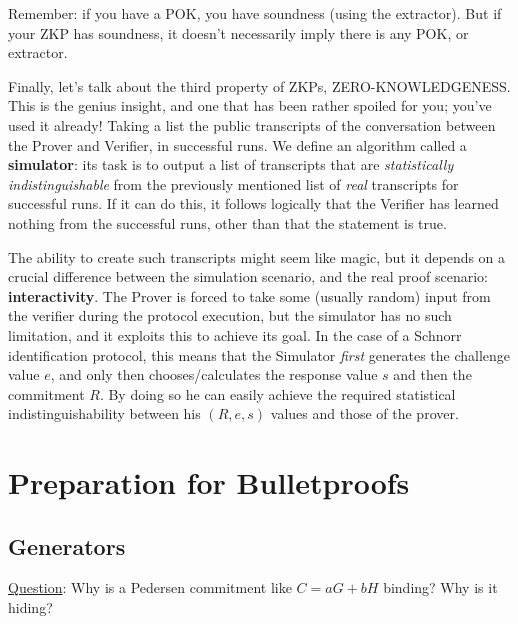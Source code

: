 \documentclass[10pt,a4paper]{article}
\begin{document}
\vspace{5 pt}

Remember: if you have a POK, you have soundness (using the extractor). But if your ZKP has soundness, it doesn't necessarily imply there is any POK, or extractor.

\vspace{5 pt}

Finally, let's talk about the third property of ZKPs, ZERO-KNOWLEDGENESS. This is the genius insight, and one that has been rather spoiled for you; you've used it already! Taking a list the public transcripts of the conversation between the Prover and Verifier, in successful runs. We define an algorithm called a \textbf{simulator}: its task is to output a list of transcripts that are \emph{statistically indistinguishable} from the previously mentioned list of \emph{real} transcripts for successful runs. If it can do this, it follows logically that the Verifier has learned nothing from the successful runs, other than that the statement is true.

\vspace{5 pt}

The ability to create such transcripts might seem like magic, but it depends on a crucial difference between the simulation scenario, and the real proof scenario: \textbf{interactivity}. The Prover is forced to take some (usually random) input from the verifier during the protocol execution, but the simulator has no such limitation, and it exploits this to achieve its goal. In the case of a Schnorr identification protocol, this means that the Simulator \emph{first} generates the challenge value $e$, and only then chooses/calculates the response value $s$ and then the commitment $R$. By doing so he can easily achieve the required statistical indistinguishability between his $(R, e, s)$ values and those of the prover.


\section{Preparation for Bulletproofs}

\subsection{Generators}

\underline{Question}: Why is a Pedersen commitment like $C = aG + bH$ binding? Why is it hiding?

\vspace{5 pt}
\end{document}
